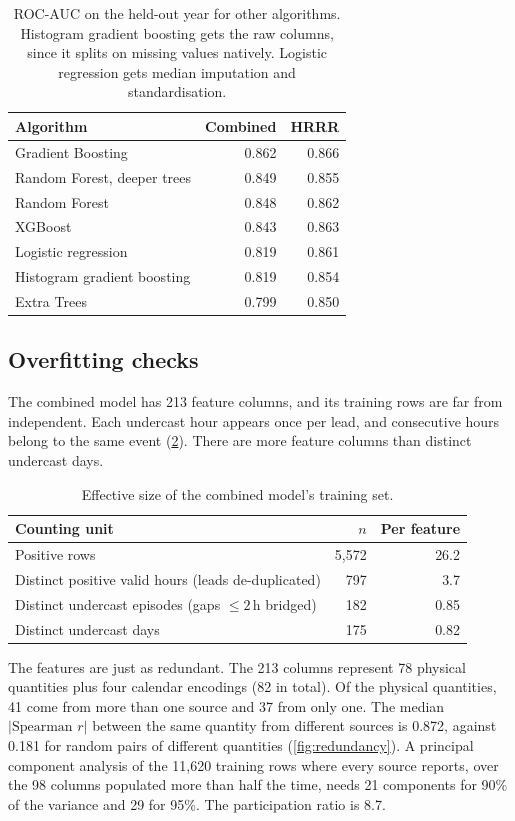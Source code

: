 \documentclass[11pt]{article}
\begin{document}
\begin{table}[ht]\centering\small
\caption{ROC-AUC on the held-out year for other algorithms. Histogram gradient boosting gets the raw
columns, since it splits on missing values natively. Logistic regression gets median imputation and
standardisation.}\label{tab:alt}
\begin{tabular}{l r r}
\toprule
Algorithm & Combined & HRRR\\
\midrule
Gradient Boosting & 0.862 & 0.866\\
Random Forest, deeper trees & 0.849 & 0.855\\
Random Forest & 0.848 & 0.862\\
XGBoost & 0.843 & 0.863\\
Logistic regression & 0.819 & 0.861\\
Histogram gradient boosting & 0.819 & 0.854\\
Extra Trees & 0.799 & 0.850\\
\bottomrule
\end{tabular}
\end{table}

\subsection{Overfitting checks}\label{sec:overfit}
The combined model has 213 feature columns, and its training rows are far from independent. Each
undercast hour appears once per lead, and consecutive hours belong to the same event
(\cref{tab:units}). There are more feature columns than distinct undercast days.

\begin{table}[ht]\centering\small
\caption{Effective size of the combined model's training set.}\label{tab:units}
\begin{tabular}{l r r}
\toprule
Counting unit & $n$ & Per feature\\
\midrule
Positive rows & 5{,}572 & 26.2\\
Distinct positive valid hours (leads de-duplicated) & 797 & 3.7\\
Distinct undercast episodes (gaps $\le2$\,h bridged) & 182 & 0.85\\
Distinct undercast days & 175 & 0.82\\
\bottomrule
\end{tabular}
\end{table}

The features are just as redundant. The 213 columns represent 78 physical quantities plus four
calendar encodings (82 in total). Of the physical quantities, 41 come from more than one source and
37 from only one. The median $|\text{Spearman } r|$ between the same quantity from different sources
is 0.872, against 0.181 for random pairs of different quantities (\cref{fig:redundancy}). A principal
component analysis of the 11{,}620 training rows where every source reports, over the 98 columns
populated more than half the time, needs 21 components for 90\% of the variance and 29 for 95\%. The
participation ratio is 8.7.
\end{document}
